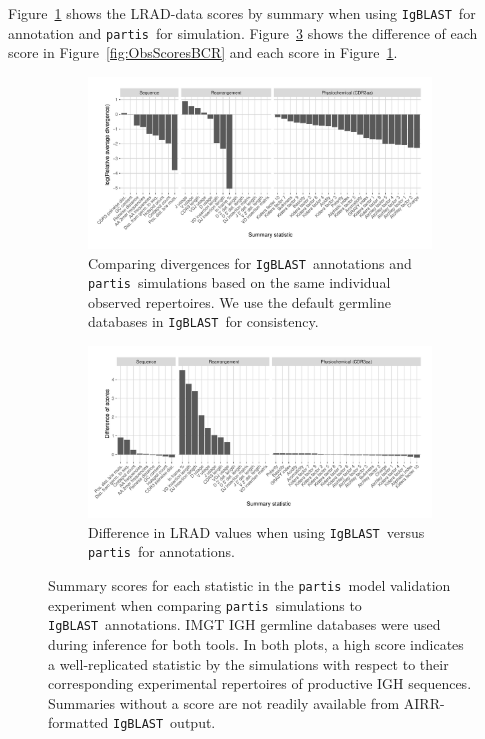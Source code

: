 \documentclass{article}
\newcommand{\partis}{\texttt{partis}}
\newcommand{\igblast}{\texttt{IgBLAST}}
\begin{document}
Figure~\ref{fig:IgBlastScores} shows the LRAD-data scores by summary when using \igblast\ for annotation and \partis\ for simulation.
Figure~\ref{fig:ScoreDiffs} shows the difference of each score in Figure~\ref{fig:ObsScoresBCR} and each score in Figure~\ref{fig:IgBlastScores}.
\begin{figure}
	\begin{subfigure}{\textwidth}
   		\includegraphics[width=\linewidth]{Figures/PartisScores/obs_score_plot_igb.pdf}
    	\caption{Comparing divergences for \igblast\ annotations and \partis\ simulations based on the same individual observed repertoires.
    	    We use the default germline databases in \igblast\ for consistency.
    	}
    	\label{fig:IgBlastScores}
	\end{subfigure}
	\begin{subfigure}{\textwidth}
   		\includegraphics[width=\linewidth]{Figures/PartisScores/score_diff.pdf}
    	\caption{Difference in LRAD values when using \igblast\ versus \partis\ for annotations.
    	}
    	\label{fig:ScoreDiffs}
	\end{subfigure}
	\caption{Summary scores for each statistic in the \partis\ model validation experiment when comparing \partis\ simulations to \igblast\ annotations.
	IMGT IGH germline databases were used during inference for both tools.
	In both plots, a high score indicates a well-replicated statistic by the simulations with respect to their corresponding experimental repertoires of productive IGH sequences.
	Summaries without a score are not readily available from AIRR-formatted \igblast\ output.
	}
\end{figure}
\end{document}
